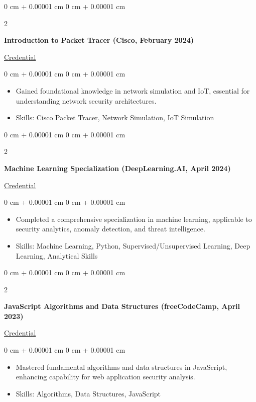 \documentclass[10pt, letterpaper]{article}
\newenvironment{highlights}{
\begin{itemize}[
topsep=0.10 cm,
parsep=0.10 cm,
partopsep=0pt,
itemsep=0pt,
leftmargin=0 cm + 10pt
]
}{
\end{itemize}
} %
\newenvironment{onecolentry}{
\begin{adjustwidth}{
0 cm + 0.00001 cm
}{
0 cm + 0.00001 cm
}
}{
\end{adjustwidth}
} %
\newenvironment{twocolentry}[2][]{
\onecolentry
\def\secondColumn{#2}
\setcolumnwidth{\fill, 4.5 cm}
\begin{paracol}{2}
}{
\switchcolumn \raggedleft \secondColumn
\end{paracol}
\endonecolentry
} %
\begin{document}
\begin{twocolentry}
	{\href{https://www.credly.com/badges/a1b2c3d4/public_url (replace with actual link if available)}{Credential}}
	\textbf{Introduction to Packet Tracer (Cisco, February 2024)} %
\end{twocolentry}
\vspace{0.10 cm}
\begin{onecolentry}
	\begin{highlights}
		\item Gained foundational knowledge in network simulation and IoT, essential for understanding network security architectures.
		\item Skills: Cisco Packet Tracer, Network Simulation, IoT Simulation
	\end{highlights}
\end{onecolentry}
\vspace{0.2 cm}

\begin{twocolentry}
	{\href{https://www.coursera.org/account/accomplishments/specialization/BA8N9Y8JDSSN}{Credential}}
	\textbf{Machine Learning Specialization (DeepLearning.AI, April 2024)}
\end{twocolentry}
\vspace{0.10 cm}
\begin{onecolentry}
	\begin{highlights}
		\item Completed a comprehensive specialization in machine learning, applicable to security analytics, anomaly detection, and threat intelligence.
		\item Skills: Machine Learning, Python, Supervised/Unsupervised Learning, Deep Learning, Analytical Skills
	\end{highlights}
\end{onecolentry}
\vspace{0.2 cm}

\begin{twocolentry}
	{\href{https://freecodecamp.org/certification/itstheavro/javascript-algorithms-and-data-structures}{Credential}}
	\textbf{JavaScript Algorithms and Data Structures (freeCodeCamp, April 2023)}
\end{twocolentry}
\vspace{0.10 cm}
\begin{onecolentry}
	\begin{highlights}
		\item Mastered fundamental algorithms and data structures in JavaScript, enhancing capability for web application security analysis.
		\item Skills: Algorithms, Data Structures, JavaScript
	\end{highlights}
\end{onecolentry}
\vspace{0.2 cm}
\end{document}

